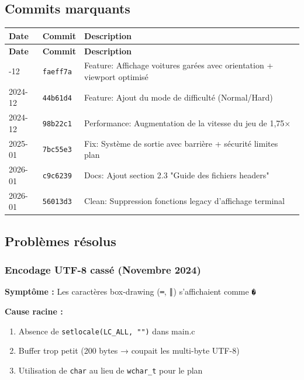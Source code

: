 \documentclass[12pt,a4paper]{article}
\begin{document}
\subsection{Commits marquants}

\begin{longtable}{|l|l|p{8cm}|}
\hline
\textbf{Date} & \textbf{Commit} & \textbf{Description} \\
\hline
\endfirsthead
\hline
\textbf{Date} & \textbf{Commit} & \textbf{Description} \\
\hline
\endhead
\hline
\endfoot
2024-12 & \texttt{faeff7a} & Feature: Affichage voitures garées avec orientation + viewport optimisé \\
\hline
2024-12 & \texttt{44b61d4} & Feature: Ajout du mode de difficulté (Normal/Hard) \\
\hline
2024-12 & \texttt{98b22c1} & Performance: Augmentation de la vitesse du jeu de 1,75× \\
\hline
2025-01 & \texttt{7bc55e3} & Fix: Système de sortie avec barrière + sécurité limites plan \\
\hline
2026-01 & \texttt{c9c6239} & Docs: Ajout section 2.3 "Guide des fichiers headers" \\
\hline
2026-01 & \texttt{56013d3} & Clean: Suppression fonctions legacy d'affichage terminal \\
\hline
\end{longtable}

\subsection{Problèmes résolus}

\subsubsection{Encodage UTF-8 cassé (Novembre 2024)}

\textbf{Symptôme :} Les caractères box-drawing (\texttt{═}, \texttt{║}) s'affichaient comme \texttt{�}

\textbf{Cause racine :}
\begin{enumerate}
    \item Absence de \texttt{setlocale(LC\_ALL, "")} dans main.c
    \item Buffer trop petit (200 bytes → coupait les multi-byte UTF-8)
    \item Utilisation de \texttt{char} au lieu de \texttt{wchar\_t} pour le plan
\end{enumerate}
\end{document}
